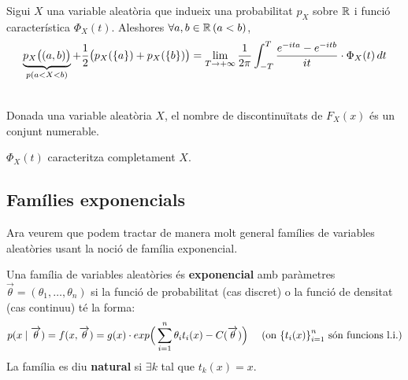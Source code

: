 \begin{thm}[(d'inversió)]
  Sigui $X$ una variable aleatòria que indueix una probabilitat $p_{X}$ sobre $\mathbb{R}$ i funció característica $\Phi_{X}(t)$. Aleshores $\forall a,b\in \mathbb{R} \, (a<b)$,
  \[
    \underbrace{p_{X}\big((a,b)\big)}_{p(a<X<b)} + \frac{1}{2}\big(p_{X}(\left\{a\right\})+p_{X}(\left\{b\right\}) \big) = \lim_{T\to+\infty}\frac{1}{2\pi}\int_{-T}^{T}\frac{e^{-ita}-e^{-itb}}{it}\cdot\Phi_{X}(t) \, dt
  \]
\end{thm}

\begin{lema} \-\\
  Donada una variable aleatòria $X$, el nombre de discontinuïtats de $F_{X}(x)$ és un conjunt numerable.
\end{lema}

\begin{col}
  $\Phi_{X}(t)$ caracteritza completament $X$.
\end{col}

\subsection{Famílies exponencials}

Ara veurem que podem tractar de manera molt general famílies de variables aleatòries usant la noció de família exponencial.

\begin{defi}
  Una família de variables aleatòries és \textbf{exponencial} amb paràmetres $\overrightarrow{\theta} = (\theta_{1},\ldots,\theta_{n})$ si la funció de probabilitat (cas discret) o la funció de densitat (cas continuu) té la forma:
  \[
    p(x\mid \overrightarrow{\theta}) = f(x,\overrightarrow{\theta}) = g(x)\cdot exp\Big(\sum_{i=1}^{n}\theta_{i}t_{i}(x)-C(\overrightarrow{\theta})\Big) \quad \text{ (on $\left\{t_{i}(x)\right\}_{i=1}^{n}$ són funcions l.i.)}
  \]
  La família es diu \textbf{natural} si $\exists k$ tal que $t_{k}(x)=x$.
\end{defi}

